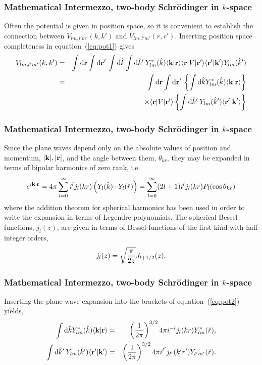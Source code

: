\documentclass[compress]{beamer}
\begin{document}
\frame
{
\frametitle{Mathematical Intermezzo, two-body Schr\"odinger in $k$-space}
\begin{small}
{\scriptsize
Often the potential is given in position space, so it is convenient to establish 
the connection between $V_{lm, l'm'}(k,k')$ and $V_{lm, l'm'}(r,r')$. Inserting 
position space completeness in equation~(\ref{eq:pot1}) gives
\begin{eqnarray}
\nonumber
  V_{lm, l'm'}(k,k')& = &\int \mathrm{d}{\bf{r}} \int \mathrm{d}{\bf{r}'}\: 
  \int \mathrm{d}{\hat{k}} \int \mathrm{d}{\hat{k}'}\: 
  Y_{lm}^*(\hat{k})\langle {\bf k}\vert {\bf r} \rangle
  \langle{\bf r}  \vert V \vert {\bf r}' \rangle
  \langle {\bf r'}\vert {\bf k}' \rangle Y_{lm}(\hat{k}') \\ \nonumber
  &=&\int \mathrm{d}{\bf{r}} \int \mathrm{d}{\bf{r}'}\: 
  \left\{ \int \mathrm{d}{\hat{k}}  Y_{lm}^*(\hat{k})\langle {\bf k}\vert {\bf r} \rangle \right\} \\
  &&\times\langle{\bf r}  \vert V \vert {\bf r}' \rangle
  \left\{ \int \mathrm{d}{\hat{k}'}\:   Y_{lm}(\hat{k}') \langle {\bf r'}\vert {\bf k}' \rangle\right\}
  \label{eq:pot2}
\end{eqnarray}
}
\end{small}
}



\frame
{
\frametitle{Mathematical Intermezzo, two-body Schr\"odinger in $k$-space}
\begin{small}
{\scriptsize
Since the plane waves depend only on the absolute values of position and momentum, 
$ \vert {\bf k} \vert, \vert {\bf r} \vert  $,
and the angle between them, $ \theta_{kr} $, they may be expanded in terms of bipolar harmonics of 
zero rank, i.e.  
\begin{equation} 
  e^{i {\bf k}\cdot {\bf r}} = 4\pi \sum_{l=0}^{\infty} i^l j_l(kr)\left( Y_l(\hat{k}) \cdot Y_l(\hat{r}) \right)
  = \sum_{l=0}^{\infty} (2l+1)i^l j_l(kr) P_l(\cos \theta_{kr}) 
\end{equation}
where the addition theorem for spherical harmonics has been used in order to write
the expansion in terms of Legendre polynomials. The spherical Bessel functions, $j_l(z)$,  
are given in terms of Bessel functions of the first kind with half integer orders,  
\[
j_l(z) = \sqrt{\pi \over 2 z} J_{l+1/2}(z).  
\]
}
\end{small}
}



\frame
{
\frametitle{Mathematical Intermezzo, two-body Schr\"odinger in $k$-space}
\begin{small}
{\scriptsize
Inserting the plane-wave expansion
into the brackets of equation~(\ref{eq:pot2}) yields, 
\begin{eqnarray}
  \nonumber
  \int \mathrm{d}{\hat{k}}  Y_{lm}^*(\hat{k})\langle {\bf k}\vert {\bf r} \rangle & = &  
  \left( {1\over 2\pi} \right) ^{3/2}4\pi i^{-l} j_l(kr) Y_{lm}^*(\hat{r}), \\  
  \nonumber
  \int \mathrm{d}{\hat{k}'}\:   Y_{lm}(\hat{k}') \langle {\bf r'}\vert {\bf k}' \rangle & = &  
  \left( {1\over 2\pi} \right) ^{3/2}4\pi i^{l'} j_{l'}(k'r') Y_{l'm'}(\hat{r}). 
\end{eqnarray}
}
\end{small}
}
\end{document}
